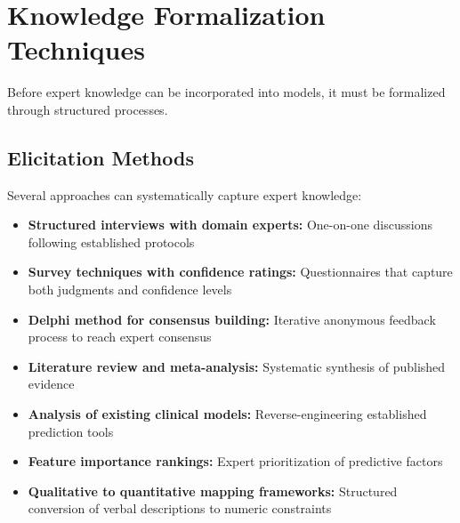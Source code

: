 \section{Knowledge Formalization Techniques}

Before expert knowledge can be incorporated into models, it must be formalized through structured processes.

\subsection{Elicitation Methods}

Several approaches can systematically capture expert knowledge:

\begin{itemize}
    \item \textbf{Structured interviews with domain experts:} One-on-one discussions following established protocols
    \item \textbf{Survey techniques with confidence ratings:} Questionnaires that capture both judgments and confidence levels
    \item \textbf{Delphi method for consensus building:} Iterative anonymous feedback process to reach expert consensus
    \item \textbf{Literature review and meta-analysis:} Systematic synthesis of published evidence
    \item \textbf{Analysis of existing clinical models:} Reverse-engineering established prediction tools
    \item \textbf{Feature importance rankings:} Expert prioritization of predictive factors
    \item \textbf{Qualitative to quantitative mapping frameworks:} Structured conversion of verbal descriptions to numeric constraints
\end{itemize}

